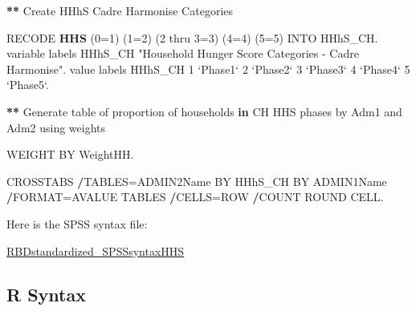 \documentclass[
]{book}
\newenvironment{Shaded}{\begin{snugshade}}{\end{snugshade}}
\newcommand{\ControlFlowTok}[1]{\textcolor[rgb]{0.13,0.29,0.53}{\textbf{#1}}}
\newcommand{\DataTypeTok}[1]{\textcolor[rgb]{0.13,0.29,0.53}{#1}}
\newcommand{\DecValTok}[1]{\textcolor[rgb]{0.00,0.00,0.81}{#1}}
\newcommand{\KeywordTok}[1]{\textcolor[rgb]{0.13,0.29,0.53}{\textbf{#1}}}
\newcommand{\NormalTok}[1]{#1}
\newcommand{\OperatorTok}[1]{\textcolor[rgb]{0.81,0.36,0.00}{\textbf{#1}}}
\newcommand{\StringTok}[1]{\textcolor[rgb]{0.31,0.60,0.02}{#1}}
\begin{document}
\begin{Shaded}
\begin{Highlighting}[]
\OperatorTok{**}\StringTok{ }\NormalTok{Create HHhS Cadre Harmonise Categories}

\NormalTok{RECODE }\KeywordTok{HHS}\NormalTok{ (}\DecValTok{0}\NormalTok{=}\DecValTok{1}\NormalTok{) (}\DecValTok{1}\NormalTok{=}\DecValTok{2}\NormalTok{) (}\DecValTok{2}\NormalTok{ thru }\DecValTok{3}\NormalTok{=}\DecValTok{3}\NormalTok{) (}\DecValTok{4}\NormalTok{=}\DecValTok{4}\NormalTok{) (}\DecValTok{5}\NormalTok{=}\DecValTok{5}\NormalTok{) INTO HHhS_CH.}
\NormalTok{variable labels HHhS_CH }\StringTok{"Household Hunger Score Categories - Cadre Harmonise"}\NormalTok{.}
\NormalTok{value labels HHhS_CH}
\DecValTok{1} \StringTok{`}\DataTypeTok{Phase1}\StringTok{`}
\DecValTok{2} \StringTok{`}\DataTypeTok{Phase2}\StringTok{`}
\DecValTok{3} \StringTok{`}\DataTypeTok{Phase3}\StringTok{`}
\DecValTok{4} \StringTok{`}\DataTypeTok{Phase4}\StringTok{`}
\DecValTok{5} \StringTok{`}\DataTypeTok{Phase5}\StringTok{`}\NormalTok{.}

\OperatorTok{**}\StringTok{ }\NormalTok{Generate table of proportion of households }\ControlFlowTok{in}\NormalTok{ CH HHS phases by Adm1 and Adm2 using weights}

\NormalTok{WEIGHT BY WeightHH.}

\NormalTok{CROSSTABS}
  \OperatorTok{/}\NormalTok{TABLES=ADMIN2Name BY HHhS_CH BY ADMIN1Name}
  \OperatorTok{/}\NormalTok{FORMAT=AVALUE TABLES}
  \OperatorTok{/}\NormalTok{CELLS=ROW }
  \OperatorTok{/}\NormalTok{COUNT ROUND CELL.}
\end{Highlighting}
\end{Shaded}

Here is the SPSS syntax file:

\href{https://github.com/WFP-VAM/RBD_FS_CH_guide_EN/blob/master/syntax/RBDstandardized_SPSSsyntaxHHS.sps}{RBDstandardized\_SPSSsyntaxHHS}

\hypertarget{r-syntax}{%
\subsection{R Syntax}\label{r-syntax}}
\end{document}
